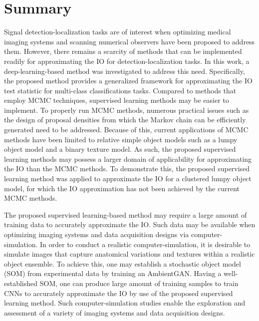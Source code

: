 \documentclass[journal]{IEEEtran}
\begin{document}
\section{Summary}
\label{sec:discussion}
Signal detection-localization tasks are of interest when optimizing medical
imaging systems and scanning numerical observers have been proposed to address them.
However, there remains a scarcity of methods that can be implemented readily for approximating
the IO for detection-localization tasks. 
In this work,
a deep-learning-based  method was investigated to address this need.
Specifically, the proposed method provides a generalized framework for approximating the IO test statistic for multi-class classifications tasks. 
Compared to methods that employ MCMC techniques, supervised learning methods may be easier to implement.
To properly run MCMC methods, numerous practical issues such as the design of proposal densities from which the Markov chain can be efficiently generated need to be addressed.
Because of this, current applications of MCMC methods have been limited to relative simple object models such as a lumpy object model and a binary texture model.
As such, the proposed supervised learning methods may possess a larger domain of applicability for approximating the IO than the MCMC methods.
To demonstrate this, the proposed supervised learning method was applied to approximate the IO for a clustered lumpy object model, 
for which the IO approximation has not been achieved by the current MCMC methods.

{
The proposed supervised learning-based method
may require a large amount of training data to accurately approximate the IO.
Such data may be available when optimizing imaging systems and data acquisition designs
via computer-simulation.
In order to conduct a realistic computer-simulation,
it is desirable to simulate images that capture anatomical variations and textures within a realistic object ensemble.
To achieve this,
one may establish a stochastic object model (SOM) from experimental data by training an AmbientGAN\cite{bora2018ambientgan, zhou2019learning, zhou2020progressively, zhou2020learning}.
Having a well-established SOM, one can produce large amount of training samples to train CNNs to accurately approximate the IO by use of the proposed supervised learning method. Such computer-simulation studies enable the exploration and assessment of a variety of imaging systems and data acquisition designs.
}
\end{document}
